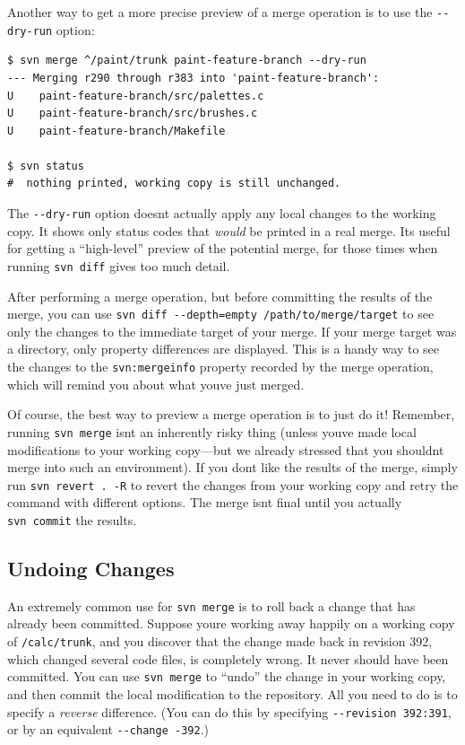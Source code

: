 Another way to get a more precise preview of a merge operation is to use
the \texttt{-\/-dry-run} option:

\begin{verbatim}
$ svn merge ^/paint/trunk paint-feature-branch --dry-run
--- Merging r290 through r383 into 'paint-feature-branch':
U    paint-feature-branch/src/palettes.c
U    paint-feature-branch/src/brushes.c
U    paint-feature-branch/Makefile

$ svn status
#  nothing printed, working copy is still unchanged.
\end{verbatim}

The \texttt{-\/-dry-run} option doesn\textquotesingle t actually apply
any local changes to the working copy. It shows only status codes that
\emph{would} be printed in a real merge. It\textquotesingle s useful for
getting a ``high-level'' preview of the potential merge, for those times
when running \texttt{svn\ diff} gives too much detail.

After performing a merge operation, but before committing the results of
the merge, you can use
\texttt{svn\ diff\ -\/-depth=empty\ /path/to/merge/target} to see only
the changes to the immediate target of your merge. If your merge target
was a directory, only property differences are displayed. This is a
handy way to see the changes to the \texttt{svn:mergeinfo} property
recorded by the merge operation, which will remind you about what
you\textquotesingle ve just merged.

Of course, the best way to preview a merge operation is to just do it!
Remember, running \texttt{svn\ merge} isn\textquotesingle t an
inherently risky thing (unless you\textquotesingle ve made local
modifications to your working copy---but we already stressed that you
shouldn\textquotesingle t merge into such an environment). If you
don\textquotesingle t like the results of the merge, simply run
\texttt{svn\ revert\ .\ -R} to revert the changes from your working copy
and retry the command with different options. The merge
isn\textquotesingle t final until you actually \texttt{svn\ commit} the
results.

\subsection{Undoing Changes}\label{svn.branchmerge.basicmerging.undo}

An extremely common use for \texttt{svn\ merge} is to roll back a change
that has already been committed. Suppose you\textquotesingle re working
away happily on a working copy of \texttt{/calc/trunk}, and you discover
that the change made back in revision 392, which changed several code
files, is completely wrong. It never should have been committed. You can
use \texttt{svn\ merge} to ``undo'' the change in your working copy, and
then commit the local modification to the repository. All you need to do
is to specify a \emph{reverse} difference. (You can do this by
specifying \texttt{-\/-revision\ 392:391}, or by an equivalent
\texttt{-\/-change\ -392}.)

